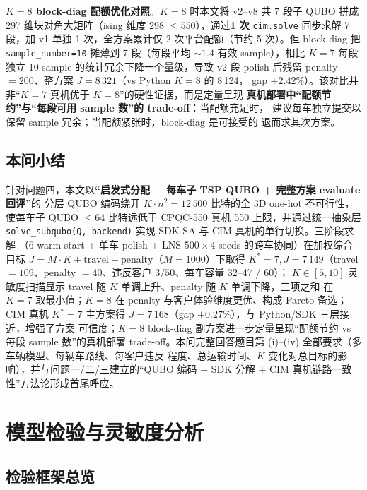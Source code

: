 \documentclass[UTF8,12pt,a4paper]{ctexart}
\begin{document}
\textbf{$K\!=\!8$ block-diag 配额优化对照}。$K=8$ 时本文将 v2--v8 共 7 段子 QUBO
拼成 297 维块对角大矩阵（ising 维度 298 $\le 550$），通过\textbf{1 次}
\texttt{cim.solve} 同步求解 7 段，加 v1 单独 1 次，全方案累计仅 2 次平台配额（节约
5 次）。但 block-diag 把 \texttt{sample\_number=10} 摊薄到 7 段（每段平均 $\sim\!1.4$
有效 sample），相比 $K=7$ 每段独立 10 sample 的统计冗余下降一个量级，导致 v2 段
polish 后残留 penalty $=200$、整方案 $J=8\,321$（vs Python $K=8$ 的 8\,124，
gap $+2.42\%$）。该对比并非``$K=7$ 真机优于 $K=8$''的硬性证据，而是定量呈现
\textbf{真机部署中``配额节约''与``每段可用 sample 数''的 trade-off}：当配额充足时，
建议每车独立提交以保留 sample 冗余；当配额紧张时，block-diag 是可接受的
退而求其次方案。

\subsection{本问小结}
\label{subsec:q4-summary}

针对问题四，本文以\textbf{``启发式分配 + 每车子 TSP QUBO + 完整方案 evaluate 回评''}的
分层 QUBO 编码绕开 $K\!\cdot\!n^{2}=12\,500$ 比特的全 3D one-hot 不可行性，使每车子 QUBO
$\le 64$ 比特远低于 CPQC-550 真机 550 上限，并通过统一抽象层
\texttt{solve\_subqubo(Q, backend)} 实现 SDK SA 与 CIM 真机的单行切换。三阶段求解
（6 warm start + 单车 polish + LNS $500\!\times\!4$ seeds 的跨车协同）在加权综合目标
$J=M\!\cdot\!K+\mathrm{travel}+\mathrm{penalty}$（$M=1000$）下取得
$K^*=7,J=7\,149$（travel $=109$、penalty $=40$、违反客户 $3/50$、每车容量 32--47 / 60）；
$K\in[5,10]$ 灵敏度扫描显示 travel 随 $K$ 单调上升、penalty 随 $K$ 单调下降，三项之和
在 $K=7$ 取最小值；$K=8$ 在 penalty 与客户体验维度更优、构成 Pareto 备选；CIM 真机
$K^*\!=\!7$ 主方案得 $J=7\,168$（gap $+0.27\%$），与 Python/SDK 三层接近，增强了方案
可信度；$K=8$ block-diag 副方案进一步定量呈现``配额节约 vs 每段 sample 数''的真机部署
trade-off。本问完整回答题目第 (i)--(iv) 全部要求（多车辆模型、每辆车路线、每客户违反
程度、总运输时间、$K$ 变化对总目标的影响），并与问题一/二/三建立的``QUBO 编码 +
SDK 分解 + CIM 真机链路一致性''方法论形成首尾呼应。

\section{模型检验与灵敏度分析}

\subsection{检验框架总览}
\end{document}
